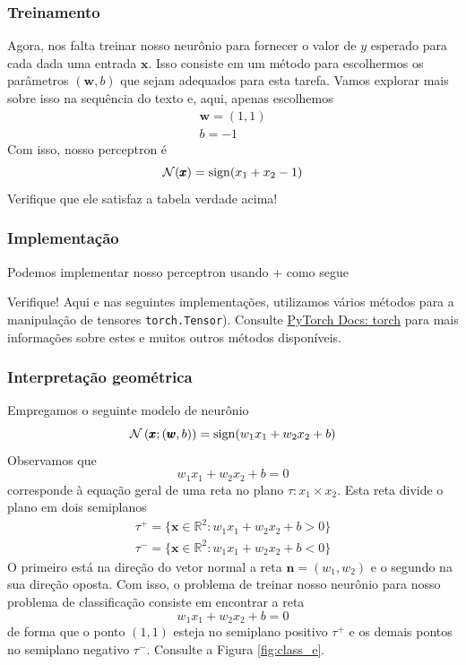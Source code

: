     
\subsubsection{Treinamento}

Agora, nos falta treinar nosso neurônio para fornecer o valor de $y$ esperado para cada dada uma entrada $\pmb{x}$. Isso consiste em um método para escolhermos os parâmetros $(\pmb{w},b)$ que sejam adequados para esta tarefa. Vamos explorar mais sobre isso na sequência do texto e, aqui, apenas escolhemos
\begin{gather}
  \pmb{w} = (1, 1)\\
  b = -1
\end{gather}
Com isso, nosso perceptron é
\begin{equation}
  \mathcal{N}(\pmb{x}) = \operatorname{sign}(x_1 + x_2 - 1)
\end{equation}
Verifique que ele satisfaz a tabela verdade acima!


\subsubsection{Implementação}

\ifispython
Podemos implementar nosso perceptron usando {\python}+{\pytorch} como segue



Verifique! Aqui e nas seguintes implementações, utilizamos vários métodos para a manipulação de tensores \lstinline+torch.Tensor+). Consulte \href{https://pytorch.org/docs/stable/torch.html}{PyTorch Docs: torch} para mais informações sobre estes e muitos outros métodos disponíveis.
\fi

\subsubsection{Interpretação geométrica}

Empregamos o seguinte modelo de neurônio
\begin{equation}
  \mathcal{N}\left(\pmb{x};(\pmb{w},b)\right) = \operatorname{sign}(w_1x_1 + w_2x_2 + b)
\end{equation}
Observamos que
\begin{equation}
  w_1x_1 + w_2x_2 + b = 0
\end{equation}
corresponde à equação geral de uma reta no plano $\tau: x_1\times x_2$. Esta reta divide o plano em dois semiplanos
\begin{align}
  \tau^+ = \{\pmb{x}\in\mathbb{R}^2: w_1x_1 + w_2x_2 + b > 0\}\\
  \tau^- = \{\pmb{x}\in\mathbb{R}^2: w_1x_1 + w_2x_2 + b < 0\}
\end{align}
O primeiro está na direção do vetor normal a reta $\pmb{n} = (w_1, w_2)$ e o segundo na sua direção oposta. Com isso, o problema de treinar nosso neurônio para nosso problema de classificação consiste em encontrar a reta
\begin{equation}
  w_1x_1 + w_2x_2 + b = 0
\end{equation}
de forma que o ponto $(1,1)$ esteja no semiplano positivo $\tau^+$ e os demais pontos no semiplano negativo $\tau^-$. Consulte a Figura \ref{fig:class_e}.


